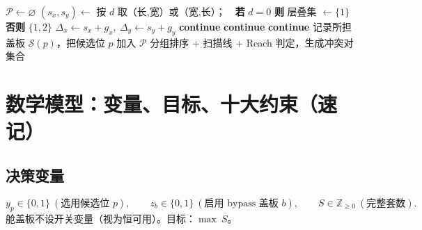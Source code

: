 \documentclass[11pt]{ctexart}
\newcommand{\setP}{\mathcal{P}}
\newcommand{\setS}{\mathcal{S}}
\begin{document}
\begin{algorithm}[ht]
\caption{候选生成（要点伪代码）}
\begin{algorithmic}[1]
\State $\setP\gets\varnothing$
  \State $(s_x,s_y)\gets$ 按 $d$ 取（长,宽）或（宽,长）；\ \ \textbf{若} $d=0$ \textbf{则} 层叠集 $\gets\{1\}$ \textbf{否则} $\{1,2\}$ 
  \State $\Delta_x\gets s_x+g_x,\ \Delta_y\gets s_y+g_y$
     \textbf{continue} \EndIf {}
     \textbf{continue} \EndIf {}
       \textbf{continue} \EndIf {}
      \State 记录所担盖板 $\setS(p)$，把候选位 $p$ 加入 $\setP$
    \EndFor
  \EndFor
\EndFor
\State 分组排序 + 扫描线 + Reach 判定，生成冲突对集合
\end{algorithmic}
\end{algorithm}

\section{数学模型：变量、目标、十大约束（速记）}

\subsection{决策变量}
\[
y_p\in\{0,1\}\ (\text{选用候选位 }p),\qquad
z_b\in\{0,1\}\ (\text{启用 bypass 盖板 }b),\qquad
S\in\mathbb{Z}_{\ge0}\ (\text{完整套数}).
\]
舱盖板不设开关变量（视为恒可用）。目标：$\boxed{\max\ S}$。
\end{document}
